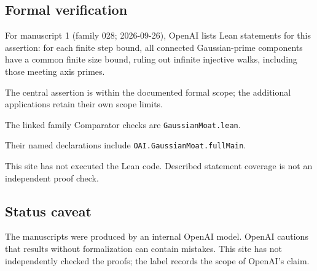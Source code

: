 \documentclass[11pt]{article}
\begin{document}
\subsection{Formal verification}
For manuscript 1 (family 028; 2026-09-26), OpenAI lists Lean statements for this assertion: for each finite step bound, all connected Gaussian-prime components have a common finite size bound, ruling out infinite injective walks, including those meeting axis primes.

The central assertion is within the documented formal scope; the additional applications retain their own scope limits.

The linked family Comparator checks are \texttt{GaussianMoat.lean}.

Their named declarations include \texttt{OAI.GaussianMoat.fullMain}.

This site has not executed the Lean code. Described statement coverage is not an independent proof check.

\subsection{Status caveat}
The manuscripts were produced by an internal OpenAI model. OpenAI cautions that results without formalization can contain mistakes. This site has not independently checked the proofs; the label records the scope of OpenAI's claim.
\end{document}
